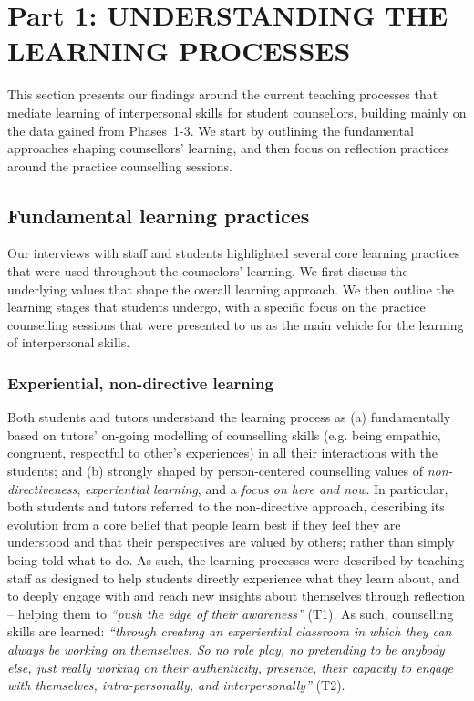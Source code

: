 \documentclass{sigchi}
\newcommand{\qq}[2]{\textrm{\textit{``#2''}}}
\begin{document}
\section{Part 1: UNDERSTANDING THE LEARNING PROCESSES}
This section presents our findings around the current teaching processes that mediate learning of interpersonal skills for student counsellors, building mainly on the data gained from Phases~1-3. We start by outlining the fundamental approaches shaping counsellors' learning, and then focus on reflection practices around the practice counselling sessions. 

\pagebreak
\subsection{Fundamental learning practices}
Our interviews with staff and students highlighted several core learning practices that were used throughout the counselors' learning. We first discuss the underlying values that shape the overall learning approach. We then outline the learning stages that students undergo, with a specific focus on the practice counselling sessions that were presented to us as the main vehicle for the learning of interpersonal skills.

\subsubsection{Experiential, non-directive learning}
Both students and tutors understand the learning process as (a) fundamentally based on tutors' on-going modelling of counselling skills (e.g. being empathic, congruent, respectful to other's experiences) in all their interactions with the students; and (b) strongly shaped by person-centered counselling values of \emph{non-directiveness}, \emph{experiential learning}, and a \emph{focus on here and now}. In particular, both students and tutors referred to the non-directive approach, describing its evolution from a core belief that people learn best if they feel they are understood and that their perspectives are valued by others; rather than simply being told what to do. As such, the learning processes were described by teaching staff as designed to help students directly experience what they learn about, and to deeply engage with and reach new insights about themselves through reflection -- helping them to \qq{}{push the edge of their awareness} (T1). As such, counselling skills are learned: \qq{}{through creating an experiential classroom in which they can always be working on themselves. So no role play, no pretending to be anybody else, just really working on their authenticity, presence, their capacity to engage with themselves, intra-personally, and interpersonally} (T2).
\end{document}
